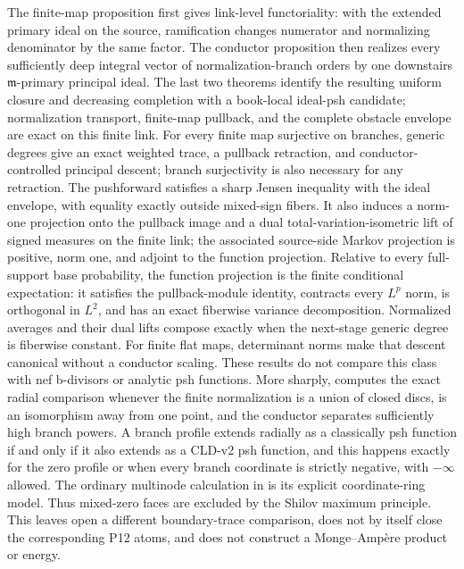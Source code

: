






The finite-map proposition first gives link-level functoriality: with the
extended primary ideal on the source, ramification changes numerator and
normalizing denominator by the same factor.  The conductor proposition then
realizes every sufficiently deep integral vector of normalization-branch
orders by one downstairs $\mathfrak m$-primary principal ideal.  The last
two theorems identify the resulting uniform closure and decreasing
completion with a book-local ideal-psh candidate; normalization transport,
finite-map pullback, and the complete obstacle envelope are exact on this
finite link.  For every finite map surjective on branches, generic degrees
give an exact weighted trace, a pullback retraction, and
conductor-controlled principal descent; branch surjectivity is also
necessary for any retraction.  The pushforward satisfies a sharp Jensen
inequality with the ideal envelope, with equality exactly outside mixed-sign
fibers.  It also induces a norm-one projection onto the pullback image and a
dual total-variation-isometric lift of signed measures on the finite link;
the associated source-side Markov projection is positive, norm one, and
adjoint to the function projection.  Relative to every full-support base
probability, the function projection is the finite conditional expectation:
it satisfies the pullback-module identity, contracts every $L^p$ norm, is
orthogonal in $L^2$, and has an exact fiberwise variance decomposition.
Normalized averages and their dual lifts compose exactly when the next-stage
generic degree is fiberwise constant.
For finite flat maps, determinant norms make that descent canonical
without a conductor scaling.  These results do not
compare this class with nef b-divisors or analytic
psh functions.  More sharply,
 computes the
exact radial comparison whenever the finite normalization is a union of
closed discs, is an isomorphism away from one point, and the conductor
separates sufficiently high branch powers.  A branch profile extends
radially as a classically psh function if and only if it also extends as a
CLD-v2 psh function, and this happens exactly for the zero profile or when
every branch coordinate is strictly negative, with $-\infty$ allowed.
The ordinary multinode calculation in
 is its explicit
coordinate-ring model.  Thus mixed-zero faces are excluded by the Shilov
maximum principle.  This leaves open a different boundary-trace comparison,
does not by itself close the corresponding P12 atoms, and does not construct
a Monge--Amp\`ere product or energy.


